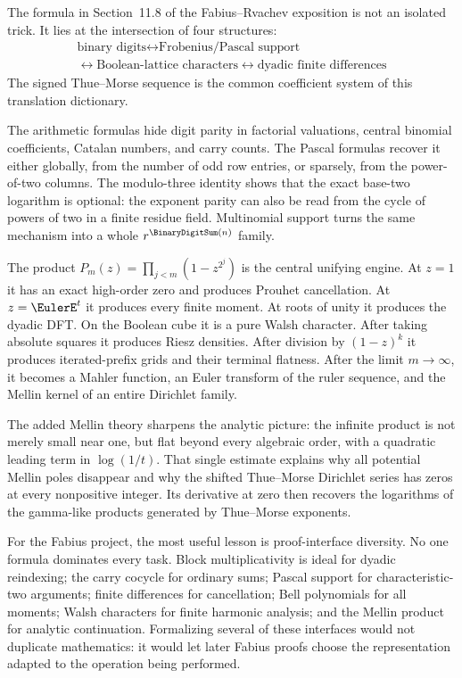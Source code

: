 \documentclass[11pt,oneside]{article}
\numberwithin{equation}{section}
\theoremstyle{definition}
\theoremstyle{remark}
\begin{document}
The formula in Section~11.8 of the Fabius--Rvachev exposition is not an
isolated trick.  It lies at the intersection of four structures:
\begin{equation}
 \boxed{\begin{gathered}
 \text{binary digits}
 \longleftrightarrow
 \text{Frobenius/Pascal support}\\
 \longleftrightarrow
 \text{Boolean-lattice characters}
 \longleftrightarrow
 \text{dyadic finite differences}
 \end{gathered}}
 \label{p1:eq:four-way-dictionary}
\end{equation}
The signed Thue--Morse sequence is the common coefficient system of this
translation dictionary.

The arithmetic formulas hide digit parity in factorial valuations, central
binomial coefficients, Catalan numbers, and carry counts.  The Pascal formulas
recover it either globally, from the number of odd row entries, or sparsely,
from the power-of-two columns.  The modulo-three identity shows that the exact
base-two logarithm is optional: the exponent parity can also be read from the
cycle of powers of two in a finite residue field.  Multinomial support turns the
same mechanism into a whole \(r^{\BinaryDigitSum(n)}\) family.

The product
\(P_m(z)=\prod_{j<m}(1-z^{2^j})\) is the central unifying engine.  At
\(z=1\) it has an exact high-order zero and produces Prouhet cancellation.  At
\(z=\EulerE^t\) it produces every finite moment.  At roots of unity it produces the
dyadic DFT.  On the Boolean cube it is a pure Walsh character.  After taking
absolute squares it produces Riesz densities.  After division by
\((1-z)^k\) it produces iterated-prefix grids and their terminal flatness.
After the limit \(m\to\infty\), it becomes a Mahler function, an Euler
transform of the ruler sequence, and the Mellin kernel of an entire Dirichlet
family.

The added Mellin theory sharpens the analytic picture: the infinite product is
not merely small near one, but flat beyond every algebraic order, with a
quadratic leading term in \(\log(1/t)\).  That single estimate explains why
all potential Mellin poles disappear and why the shifted Thue--Morse Dirichlet
series has zeros at every nonpositive integer.  Its derivative at zero then
recovers the logarithms of the gamma-like products generated by Thue--Morse
exponents.

For the Fabius project, the most useful lesson is proof-interface diversity.
No one formula dominates every task.  Block multiplicativity is ideal for
dyadic reindexing; the carry cocycle for ordinary sums; Pascal support for
characteristic-two arguments; finite differences for cancellation; Bell
polynomials for all moments; Walsh characters for finite harmonic analysis;
and the Mellin product for analytic continuation.  Formalizing several of
these interfaces would not duplicate mathematics: it would let later Fabius
proofs choose the representation adapted to the operation being performed.
\end{document}
